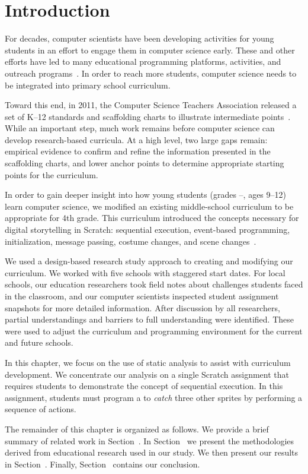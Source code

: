 \section{Introduction}
For decades, computer scientists have been developing activities for young
students in an effort to engage them in computer science early. These and other
efforts have led to many educational programming platforms, activities, and
outreach programs~\cite{wayanoutpost, georgiaoutreach,
  Franklin:2011:ATA:1953163.1953295, Maloney:2010:SPL:1868358.1868363,
  Dann:2000:MCP:343048.343070, Hood:2005:TPL:1067445.1067454, csunplugged}. In
order to reach more students, computer science needs to be integrated into
primary school curriculum.

Toward this end, in 2011, the Computer Science Teachers Association released a
set of K--12 standards and scaffolding charts to illustrate intermediate
points~\cite{cstastandards}. While an important step, much work remains before
computer science can develop research-based curricula. At a high level, two
large gaps remain: empirical evidence to confirm and refine the information
presented in the scaffolding charts, and lower anchor points to determine
appropriate starting points for the curriculum.

In order to gain deeper insight into how young students (grades
--, ages 9--12) learn computer science, we modified an existing
middle-school curriculum to be appropriate for 4th grade. This curriculum
introduced the concepts necessary for digital storytelling in Scratch:
sequential execution, event-based programming, initialization, message passing,
costume changes, and scene changes~\cite{Franklin:2013:SBO}.

We used a design-based research study approach to creating and modifying our
curriculum. We worked with five schools with staggered start dates. For local
schools, our education researchers took field notes about challenges students
faced in the classroom, and our computer scientists inspected student
assignment snapshots for more detailed information. After discussion by all
researchers, partial understandings and barriers to full understanding were
identified. These were used to adjust the curriculum and programming
environment for the current and future schools.

In this chapter, we focus on the use of static analysis to assist with
curriculum development. We concentrate our analysis on a single Scratch
assignment that requires students to demonstrate the concept of sequential
execution. In this assignment, students must program a \net{} to \emph{catch}
three other sprites by performing a sequence of actions.

The remainder of this chapter is organized as follows. We provide a brief
summary of related work in Section~. In
Section~ we present the methodologies derived from
educational research used in our study. We then present our results in
Section~. Finally, Section~
contains our conclusion.
